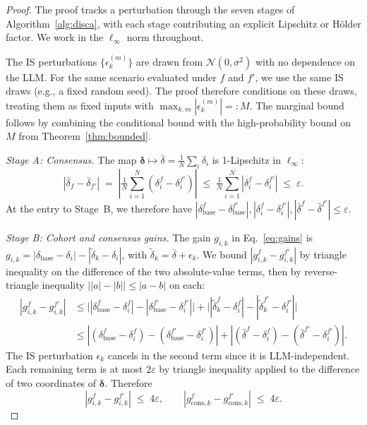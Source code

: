 \documentclass{article}
\begin{document}
\begin{proof}
The proof tracks a perturbation through the seven stages of Algorithm~\ref{alg:disca}, with each stage contributing an explicit Lipschitz or H\"older factor. We work in the $\ell_\infty$ norm throughout.

The IS perturbations $\{\epsilon_k^{(m)}\}$ are drawn from $\mathcal{N}(0, \sigma^2)$ with no dependence on the LLM. For the same scenario evaluated under $f$ and $f'$, we use the same IS draws (e.g., a fixed random seed). The proof therefore conditions on these draws, treating them as fixed inputs with $\max_{k,m}|\epsilon_k^{(m)}| =: M$. The marginal bound follows by combining the conditional bound with the high-probability bound on $M$ from Theorem~\ref{thm:bounded}.

\textit{Stage A: Consensus.} The map $\boldsymbol{\delta} \mapsto \bar\delta = \tfrac{1}{N}\sum_i \delta_i$ is 1-Lipschitz in $\ell_\infty$:
\begin{equation*}
|\bar\delta_f - \bar\delta_{f'}| \;=\; \left|\tfrac{1}{N}\sum_{i=1}^N (\delta_i^f - \delta_i^{f'})\right| \;\leq\; \tfrac{1}{N}\sum_{i=1}^N |\delta_i^f - \delta_i^{f'}| \;\leq\; \varepsilon.
\end{equation*}
At the entry to Stage~B, we therefore have $|\delta_{\text{base}}^f - \delta_{\text{base}}^{f'}|, |\delta_i^f - \delta_i^{f'}|, |\bar\delta^f - \bar\delta^{f'}| \leq \varepsilon$.

\textit{Stage B: Cohort and consensus gains.} The gain $g_{i,k}$ in Eq.~\ref{eq:gains} is $g_{i,k} = |\delta_{\text{base}} - \delta_i| - |\tilde\delta_k - \delta_i|$, with $\tilde\delta_k = \bar\delta + \epsilon_k$. We bound $|g_{i,k}^f - g_{i,k}^{f'}|$ by triangle inequality on the difference of the two absolute-value terms, then by reverse-triangle inequality $\big||a|-|b|\big| \leq |a-b|$ on each:
\begin{align*}
|g_{i,k}^f - g_{i,k}^{f'}| 
&\leq \big||\delta_{\text{base}}^f - \delta_i^f| - |\delta_{\text{base}}^{f'} - \delta_i^{f'}|\big| + \big||\tilde\delta_k^f - \delta_i^f| - |\tilde\delta_k^{f'} - \delta_i^{f'}|\big| \\
&\leq |(\delta_{\text{base}}^f - \delta_i^f) - (\delta_{\text{base}}^{f'} - \delta_i^{f'})| + |(\bar\delta^f - \delta_i^f) - (\bar\delta^{f'} - \delta_i^{f'})|.
\end{align*}
The IS perturbation $\epsilon_k$ cancels in the second term since it is LLM-independent. Each remaining term is at most $2\varepsilon$ by triangle inequality applied to the difference of two coordinates of $\boldsymbol{\delta}$. Therefore
\begin{equation*}
|g_{i,k}^f - g_{i,k}^{f'}| \;\leq\; 4\varepsilon, \qquad |g_{\text{cons},k}^f - g_{\text{cons},k}^{f'}| \;\leq\; 4\varepsilon.
\end{equation*}


\end{proof}
\end{document}
